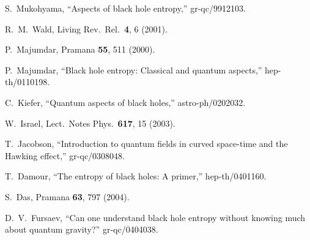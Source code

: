 \documentclass[12pt]{article} \usepackage{latexsym}
\begin{document}
\begin{thebibliography}{99}
 S.~Mukohyama, ``Aspects of black hole entropy,''
  gr-qc/9912103.

 R.~M.~Wald, Living Rev.\ Rel.\  {\bf 4}, 6 (2001).

 P.~Majumdar, Pramana {\bf 55}, 511 (2000).

 P.~Majumdar, ``Black hole entropy: Classical and
  quantum aspects,'' hep-th/0110198.

 C.~Kiefer, ``Quantum aspects of black holes,''
  astro-ph/0202032.

 W.~Israel, Lect.\ Notes Phys.\  {\bf 617}, 15 (2003).

 T.~Jacobson, ``Introduction to quantum fields in
curved space-time and the Hawking effect,'' gr-qc/0308048.

 T.~Damour, ``The entropy of black holes: A primer,''
  hep-th/0401160.

 S.~Das, Pramana {\bf 63}, 797 (2004).

 D.~V.~Fursaev, ``Can one understand black hole
  entropy without knowing much about quantum gravity?'' gr-qc/0404038.

\end{thebibliography}
\end{document}
